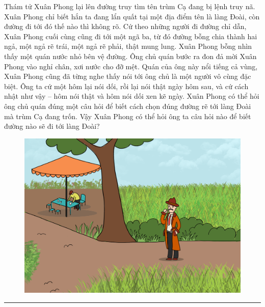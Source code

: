 \begin{multicols}{2}
	Thám tử Xuân Phong lại lên đường truy tìm tên trùm Cạ đang bị lệnh truy nã. Xuân Phong chỉ biết hắn ta đang lẩn quất tại một địa điểm tên là làng Đoài, còn đường đi tới đó thế nào thì không rõ. Cứ theo những người đi đường chỉ dẫn, Xuân Phong cuối cùng cũng đi tới một ngã ba, từ đó đường bỗng chia thành hai ngả, một ngả rẽ trái, một ngả rẽ phải, thật mung lung. Xuân Phong bỗng nhìn thấy một quán nước nhỏ bên vệ đường. Ông chủ quán bước ra đon đả mời Xuân Phong vào nghỉ chân, xơi nước cho đỡ mệt. Quán của ông này nổi tiếng cả vùng, Xuân Phong cũng đã từng nghe thấy nói tới ông chủ là một người vô cùng đặc biệt. Ông ta cứ một hôm lại nói dối, rồi lại nói thật ngày hôm sau, và cứ cách nhật như vậy -- hôm nói thật và hôm nói dối xen kẽ ngày. Xuân Phong có thể hỏi ông chủ quán đúng một câu hỏi để biết cách chọn đúng đường rẽ tới làng Đoài mà trùm Cạ đang trốn. Vậy Xuân Phong có thể hỏi ông ta câu hỏi nào để biết đường nào sẽ đi tới làng Đoài?
	\begin{figure}[H]
		\vspace*{-5pt}
		\centering
		\captionsetup{labelformat= empty, justification=centering}
		\includegraphics[width= 1\linewidth]{xp}
		\vspace*{-5pt}
	\end{figure}
\end{multicols}
\vspace*{-15pt}
\rule{1\linewidth}{0.1pt}
\begingroup
